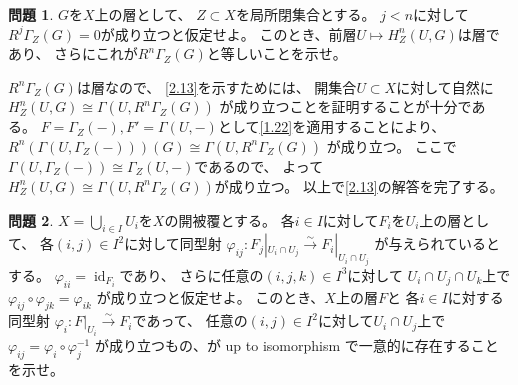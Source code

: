 \documentclass[uplatex,dvipdfmx]{jsarticle}
\makeatletter
\theoremstyle{definition}
\newtheorem{prob}[prob]{問題}
\renewenvironment{proof}[1][\proofname]{
  \pushQED{\qed}%
  \normalfont \topsep6\p@\@plus6\p@\relax
  \trivlist
  \item[\hskip\labelsep
    #1\@addpunct{\textbf{.}}]\ignorespaces
}{%
  \popQED\endtrivlist\@endpefalse
}
\providecommand{\proofname}{証明}
\DeclareMathOperator{\id}{\mathrm{id}}
\makeatother
\begin{document}
\begin{prob}\label{2.13}
  \(G\)を\(X\)上の層として、
  \(Z\subset X\)を局所閉集合とする。
  \(j<n\)に対して\(R^j\Gamma_Z(G)=0\)が成り立つと仮定せよ。
  このとき、前層\(U\mapsto H^n_Z(U,G)\)は層であり、
  さらにこれが\(R^n\Gamma_Z(G)\)と等しいことを示せ。
\end{prob}

\begin{proof}
  \(R^n\Gamma_Z(G)\)は層なので、
  \autoref{2.13}を示すためには、
  開集合\(U\subset X\)に対して自然に
  \(H^n_Z(U,G)\cong \Gamma(U,R^n\Gamma_Z(G))\)
  が成り立つことを証明することが十分である。
  \(F=\Gamma_Z(-), F'=\Gamma(U,-)\)として\autoref{1.22}を適用することにより、
  \(R^n(\Gamma(U,\Gamma_Z(-)))(G)\cong \Gamma(U,R^n\Gamma_Z(G))\)
  が成り立つ。
  ここで\(\Gamma(U,\Gamma_Z(-))\cong \Gamma_Z(U,-)\)であるので、
  よって\(H^n_Z(U,G)\cong \Gamma(U,R^n\Gamma_Z(G))\)が成り立つ。
  以上で\autoref{2.13}の解答を完了する。
\end{proof}













\begin{prob}\label{2.14}
  \(X = \bigcup_{i\in I}U_i\)を\(X\)の開被覆とする。
  各\(i\in I\)に対して\(F_i\)を\(U_i\)上の層として、
  各\((i,j)\in I^2\)に対して同型射
  \(\varphi_{ij}:F_j|_{U_i\cap U_j} \xrightarrow{\sim} F_i|_{U_i\cap U_j}\)
  が与えられているとする。
  \(\varphi_{ii}=\id_{F_i}\)であり、
  さらに任意の\((i,j,k)\in I^3\)に対して
  \(U_i\cap U_j\cap U_k\)上で
  \(\varphi_{ij}\circ \varphi_{jk}=\varphi_{ik}\)
  が成り立つと仮定せよ。
  このとき、\(X\)上の層\(F\)と
  各\(i\in I\)に対する同型射
  \(\varphi_i:F|_{U_i}\xrightarrow{\sim} F_i\)であって、
  任意の\((i,j)\in I^2\)に対して\(U_i\cap U_j\)上で
  \(\varphi_{ij} = \varphi_i\circ \varphi_j^{-1}\)
  が成り立つもの、が up to isomorphism で一意的に存在することを示せ。
\end{prob}
\end{document}
